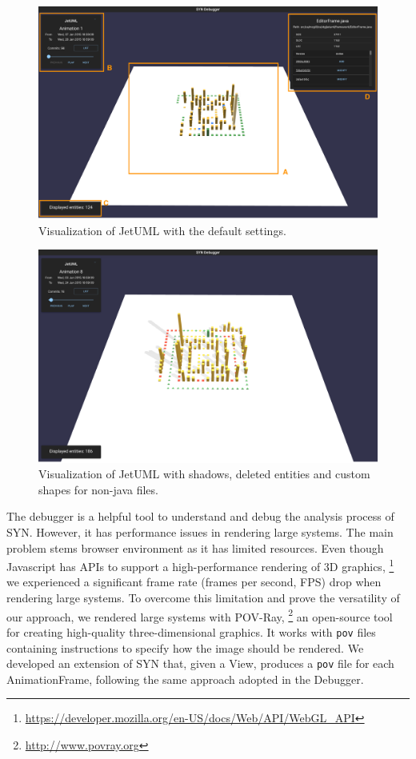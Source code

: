 \begin{figure}
    \center
    \includegraphics[width=\textwidth]{SYNUI-fileHistory.png}
    \caption{Visualization of JetUML with the default settings.}
    \label{fig:fileHistories}
\end{figure}

\begin{figure}
    \center
    \includegraphics[width=\textwidth]{SYNUI-deletedshadow.png}
    \caption{Visualization of JetUML with shadows, deleted entities and custom shapes for non-java files.}
    \label{fig:deletedshadow}
\end{figure}


The debugger is a helpful tool to understand and debug the analysis process of SYN. However, it has performance issues in rendering large systems. The main problem stems browser environment as it has limited resources. Even though Javascript has APIs to support a high-performance rendering of 3D graphics, \footnote{\url{https://developer.mozilla.org/en-US/docs/Web/API/WebGL_API}} we experienced a significant frame rate (frames per second, FPS) drop when rendering large systems. To overcome this limitation and prove the versatility of our approach, we rendered large systems with POV-Ray, \footnote{\url{http://www.povray.org}} an open-source tool for creating high-quality three-dimensional graphics. It works with \texttt{pov} files containing instructions to specify how the image should be rendered. We developed an extension of SYN that, given a View, produces a \texttt{pov} file for each AnimationFrame, following the same approach adopted in the Debugger.  


